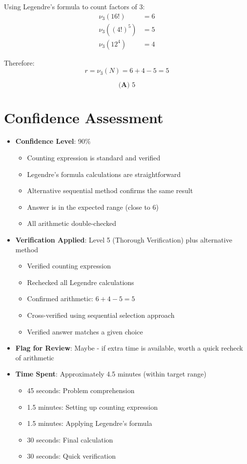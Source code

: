 \documentclass[12pt]{article}
\begin{document}
Using Legendre's formula to count factors of 3:
\begin{align*}
    \nu_3(16!) &= 6 \\
    \nu_3((4!)^5) &= 5 \\
    \nu_3(12^4) &= 4
\end{align*}

Therefore:
$$r = \nu_3(N) = 6 + 4 - 5 = 5$$

$$\boxed{\textbf{(A) } 5}$$

\section*{Confidence Assessment}
\begin{itemize}[leftmargin=*]
    \item \textbf{Confidence Level}: 90\%
    \begin{itemize}
        \item Counting expression is standard and verified
        \item Legendre's formula calculations are straightforward
        \item Alternative sequential method confirms the same result
        \item Answer is in the expected range (close to 6)
        \item All arithmetic double-checked
    \end{itemize}
    
    \item \textbf{Verification Applied}: Level 5 (Thorough Verification) plus alternative method
    \begin{itemize}
        \item Verified counting expression
        \item Rechecked all Legendre calculations
        \item Confirmed arithmetic: $6 + 4 - 5 = 5$
        \item Cross-verified using sequential selection approach
        \item Verified answer matches a given choice
    \end{itemize}
    
    \item \textbf{Flag for Review}: Maybe - if extra time is available, worth a quick recheck of arithmetic
    
    \item \textbf{Time Spent}: Approximately 4.5 minutes (within target range)
    \begin{itemize}
        \item 45 seconds: Problem comprehension
        \item 1.5 minutes: Setting up counting expression
        \item 1.5 minutes: Applying Legendre's formula
        \item 30 seconds: Final calculation
        \item 30 seconds: Quick verification
    \end{itemize}
\end{itemize}
\end{document}
